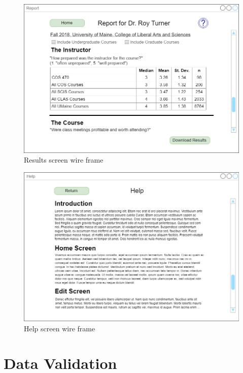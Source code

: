 \documentclass{article}
\begin{document}
\begin{center}
\begin{figure}
    \centering
    \includegraphics[scale=.3]{images/results_screen.png}
    \caption{Results screen wire frame}
    \label{fig:my_label}
\end{figure}
\end{center}

\begin{center}
\begin{figure}
    \centering
    \includegraphics[scale=.3]{images/help_screen.png}
    \caption{Help screen wire frame}
    \label{fig:my_label}
\end{figure}
\end{center}

\section{Data Validation}
\end{document}
